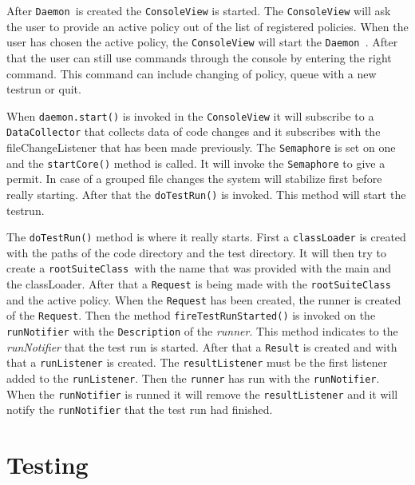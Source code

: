 \documentclass[i2]{oss}
\newcommand{\class}[1]{\texttt{#1}}
\newcommand{\method}[1]{\texttt{#1}}
\newcommand{\Deamon}{\class{Daemon  }}
\begin{document}
After \Deamon is created the \class{ConsoleView} is started. The \class{ConsoleView} will ask the user to provide an active policy out of the list of registered policies. When the user has chosen the active policy, the \class{ConsoleView} will start the \Deamon. After that the user can still use commands through the console by entering the right command. This command can include changing of policy, queue with a new testrun or quit. 

When \method{daemon.start()} is invoked in the \class{ConsoleView} it will subscribe to a \class{DataCollector} that collects data of code changes and it subscribes with the fileChangeListener that has been made previously. The \class{Semaphore} is set on one and the \method{startCore()} method is called. It will invoke the \class{Semaphore} to give a permit. In case of a grouped file changes the system will stabilize first before really starting. After that the \method{doTestRun()} is invoked. This method will start the testrun.

The \method{doTestRun()} method is where it really starts. First a \class{classLoader} is created with the paths of the code directory and the test directory. It will then try to create a \class{rootSuiteClass }with the name that was provided with the main and the classLoader.
After that a \class{Request} is being made with the \class{rootSuiteClass} and the active policy. When the \class{Request} has been created, the runner is created of the \class{Request}. Then the method \method{fireTestRunStarted()} is invoked on the \class{runNotifier} with the \class{Description} of the \emph{runner}. This method indicates to the \emph{runNotifier} that the test run is started. 
After that a \class{Result} is created and with that a \class{runListener} is created.  The \class{resultListener} must be the first listener added to the \class{runListener}. Then the \class{runner} has run with the \class{runNotifier}. When the \class{runNotifier} is runned it will remove the \class{resultListener} and it will notify the \class{runNotifier} that the test run had finished.



\section{Testing}
\label{ssec:testing}
\end{document}
